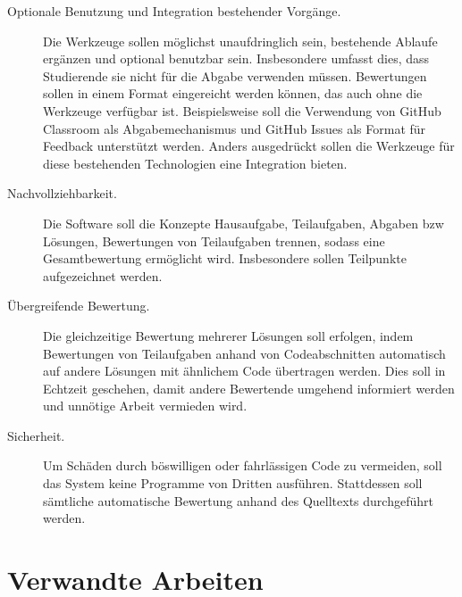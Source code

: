 \begin{description}
    \item[Optionale Benutzung und Integration bestehender Vorgänge.]
    Die Werkzeuge sollen möglichst unaufdringlich sein, bestehende Ablaufe ergänzen und optional benutzbar sein.
    Insbesondere umfasst dies, dass Studierende sie nicht für die Abgabe verwenden müssen.
    Bewertungen sollen in einem Format eingereicht werden können, das auch ohne die Werkzeuge verfügbar ist.
    Beispielsweise soll die Verwendung von GitHub Classroom als Abgabemechanismus und GitHub Issues als Format für Feedback unterstützt werden.
    Anders ausgedrückt sollen die Werkzeuge für diese bestehenden Technologien eine Integration bieten.
    \item[Nachvollziehbarkeit.]
    Die Software soll die Konzepte Hausaufgabe, Teilaufgaben, Abgaben \ac{bzw} Lösungen, Bewertungen von Teilaufgaben trennen, sodass eine Gesamtbewertung ermöglicht wird.
    Insbesondere sollen Teilpunkte aufgezeichnet werden.
    \item[Übergreifende Bewertung.]
    Die gleichzeitige Bewertung mehrerer Lösungen soll erfolgen, indem Bewertungen von Teilaufgaben anhand von Codeabschnitten automatisch auf andere Lösungen mit ähnlichem Code übertragen werden.
    Dies soll in Echtzeit geschehen, damit andere Bewertende umgehend informiert werden und unnötige Arbeit vermieden wird.
    \item[Sicherheit.]
    Um Schäden durch böswilligen oder fahrlässigen Code zu vermeiden, soll das System keine Programme von Dritten ausführen.
    Stattdessen soll sämtliche automatische Bewertung anhand des Quelltexts durchgeführt werden.
\end{description}

\section{Verwandte Arbeiten}\label{sec:related-work}


